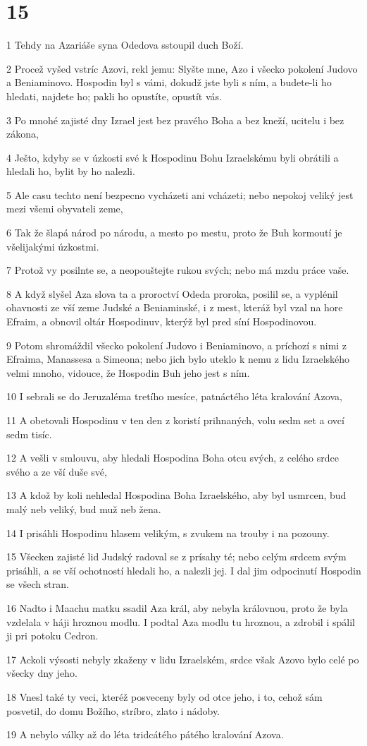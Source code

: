 \chapter{15}

\par 1 Tehdy na Azariáše syna Odedova sstoupil duch Boží.
\par 2 Procež vyšed vstríc Azovi, rekl jemu: Slyšte mne, Azo i všecko pokolení Judovo a Beniaminovo. Hospodin byl s vámi, dokudž jste byli s ním, a budete-li ho hledati, najdete ho; pakli ho opustíte, opustít vás.
\par 3 Po mnohé zajisté dny Izrael jest bez pravého Boha a bez kneží, ucitelu i bez zákona,
\par 4 Ješto, kdyby se v úzkosti své k Hospodinu Bohu Izraelskému byli obrátili a hledali ho, bylit by ho nalezli.
\par 5 Ale casu techto není bezpecno vycházeti ani vcházeti; nebo nepokoj veliký jest mezi všemi obyvateli zeme,
\par 6 Tak že šlapá národ po národu, a mesto po mestu, proto že Buh kormoutí je všelijakými úzkostmi.
\par 7 Protož vy posilnte se, a neopouštejte rukou svých; nebo má mzdu práce vaše.
\par 8 A když slyšel Aza slova ta a proroctví Odeda proroka, posilil se, a vyplénil ohavnosti ze vší zeme Judské a Beniaminské, i z mest, kteráž byl vzal na hore Efraim, a obnovil oltár Hospodinuv, kterýž byl pred síní Hospodinovou.
\par 9 Potom shromáždil všecko pokolení Judovo i Beniaminovo, a príchozí s nimi z Efraima, Manassesa a Simeona; nebo jich bylo uteklo k nemu z lidu Izraelského velmi mnoho, vidouce, že Hospodin Buh jeho jest s ním.
\par 10 I sebrali se do Jeruzaléma tretího mesíce, patnáctého léta kralování Azova,
\par 11 A obetovali Hospodinu v ten den z koristí prihnaných, volu sedm set a ovcí sedm tisíc.
\par 12 A vešli v smlouvu, aby hledali Hospodina Boha otcu svých, z celého srdce svého a ze vší duše své,
\par 13 A kdož by koli nehledal Hospodina Boha Izraelského, aby byl usmrcen, bud malý neb veliký, bud muž neb žena.
\par 14 I prisáhli Hospodinu hlasem velikým, s zvukem na trouby i na pozouny.
\par 15 Všecken zajisté lid Judský radoval se z prísahy té; nebo celým srdcem svým prisáhli, a se vší ochotností hledali ho, a nalezli jej. I dal jim odpocinutí Hospodin se všech stran.
\par 16 Nadto i Maachu matku ssadil Aza král, aby nebyla královnou, proto že byla vzdelala v háji hroznou modlu. I podtal Aza modlu tu hroznou, a zdrobil i spálil ji pri potoku Cedron.
\par 17 Ackoli výsosti nebyly zkaženy v lidu Izraelském, srdce však Azovo bylo celé po všecky dny jeho.
\par 18 Vnesl také ty veci, kteréž posveceny byly od otce jeho, i to, cehož sám posvetil, do domu Božího, stríbro, zlato i nádoby.
\par 19 A nebylo války až do léta tridcátého pátého kralování Azova.

